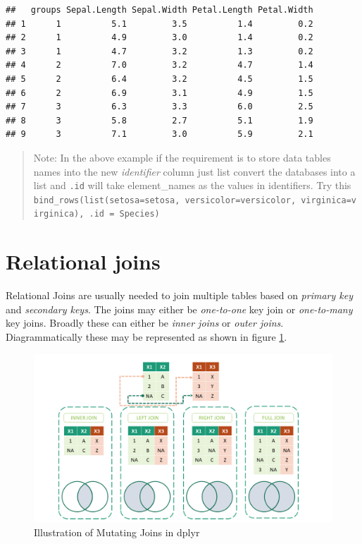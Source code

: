 \documentclass[
]{book}
\begin{document}
\begin{verbatim}
##   groups Sepal.Length Sepal.Width Petal.Length Petal.Width
## 1      1          5.1         3.5          1.4         0.2
## 2      1          4.9         3.0          1.4         0.2
## 3      1          4.7         3.2          1.3         0.2
## 4      2          7.0         3.2          4.7         1.4
## 5      2          6.4         3.2          4.5         1.5
## 6      2          6.9         3.1          4.9         1.5
## 7      3          6.3         3.3          6.0         2.5
## 8      3          5.8         2.7          5.1         1.9
## 9      3          7.1         3.0          5.9         2.1
\end{verbatim}

\begin{quote}
Note: In the above example if the requirement is to store data tables names into the new \emph{identifier} column just list convert the databases into a list and \texttt{.id} will take element\_names as the values in identifiers. Try this \texttt{bind\_rows(list(setosa=setosa,\ versicolor=versicolor,\ virginica=virginica),\ .id\ =\ \textquotesingle{}Species\textquotesingle{})}
\end{quote}

\hypertarget{relational-joins}{%
\section{Relational joins}\label{relational-joins}}

Relational Joins are usually needed to join multiple tables based on \emph{primary key} and \emph{secondary keys}. The joins may either be \emph{one-to-one} key join or \emph{one-to-many} key joins. Broadly these can either be \emph{inner joins} or \emph{outer joins}. Diagrammatically these may be represented as shown in figure \ref{fig:joinm}.

\begin{figure}

{\centering \includegraphics[width=0.99\linewidth]{images/mutating_joins} 

}

\caption{Illustration of Mutating Joins in dplyr}\label{fig:joinm}
\end{figure}
\end{document}
